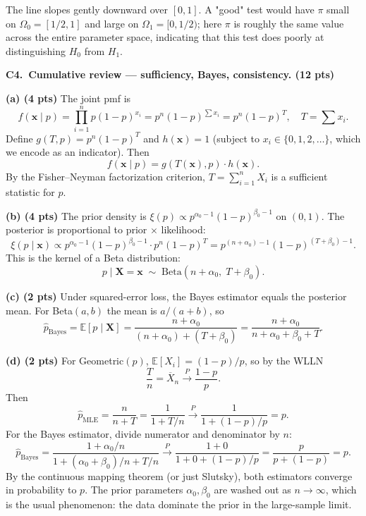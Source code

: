 \documentclass[11pt]{article}
\begin{document}
The line slopes gently downward over $[0, 1]$. A "good" test would have $\pi$ small on $\Omega_0 = [1/2, 1]$ and large on $\Omega_1 = [0, 1/2)$; here $\pi$ is roughly the same value across the entire parameter space, indicating that this test does poorly at distinguishing $H_0$ from $H_1$.

\vspace{0.6em}

\textbf{C4.\ Cumulative review --- sufficiency, Bayes, consistency. (12 pts)}

\textbf{(a) (4 pts)} The joint pmf is
\[
    f(\mathbf{x} \mid p) = \prod_{i=1}^n p(1-p)^{x_i} = p^n (1-p)^{\sum x_i} = p^n (1-p)^{T}, \quad T = \sum x_i.
\]
Define $g(T, p) = p^n (1-p)^T$ and $h(\mathbf{x}) = 1$ (subject to $x_i \in \{0, 1, 2, \dots\}$, which we encode as an indicator). Then
\[
    f(\mathbf{x}\mid p) = g(T(\mathbf{x}), p)\cdot h(\mathbf{x}).
\]
By the Fisher--Neyman factorization criterion, $T = \sum_{i=1}^n X_i$ is a sufficient statistic for $p$.

\textbf{(b) (4 pts)} The prior density is $\xi(p) \propto p^{\alpha_0 - 1}(1-p)^{\beta_0 - 1}$ on $(0,1)$. The posterior is proportional to prior $\times$ likelihood:
\[
    \xi(p \mid \mathbf{x}) \propto p^{\alpha_0 - 1}(1-p)^{\beta_0 - 1} \cdot p^n (1-p)^T
    = p^{(n + \alpha_0) - 1}(1-p)^{(T + \beta_0) - 1}.
\]
This is the kernel of a Beta distribution:
\[
    p \mid \mathbf{X} = \mathbf{x} \;\sim\; \text{Beta}(n + \alpha_0,\; T + \beta_0).
\]

\textbf{(c) (2 pts)} Under squared-error loss, the Bayes estimator equals the posterior mean. For Beta$(a, b)$ the mean is $a/(a+b)$, so
\[
    \widehat{p}_{\text{Bayes}} = \mathbb{E}[p \mid \mathbf{X}] = \frac{n + \alpha_0}{(n + \alpha_0) + (T + \beta_0)} = \frac{n + \alpha_0}{n + \alpha_0 + \beta_0 + T}.
\]

\textbf{(d) (2 pts)} For Geometric$(p)$, $\mathbb{E}[X_i] = (1-p)/p$, so by the WLLN
\[
    \frac{T}{n} = \overline{X}_n \xrightarrow{P} \frac{1-p}{p}.
\]
Then
\[
    \widehat{p}_{\text{MLE}} = \frac{n}{n + T} = \frac{1}{1 + T/n} \xrightarrow{P} \frac{1}{1 + (1-p)/p} = p.
\]
For the Bayes estimator, divide numerator and denominator by $n$:
\[
    \widehat{p}_{\text{Bayes}} = \frac{1 + \alpha_0/n}{1 + (\alpha_0 + \beta_0)/n + T/n} \xrightarrow{P} \frac{1 + 0}{1 + 0 + (1-p)/p} = \frac{p}{p + (1-p)} = p.
\]
By the continuous mapping theorem (or just Slutsky), both estimators converge in probability to $p$. The prior parameters $\alpha_0, \beta_0$ are washed out as $n \to \infty$, which is the usual phenomenon: the data dominate the prior in the large-sample limit.
\end{document}
